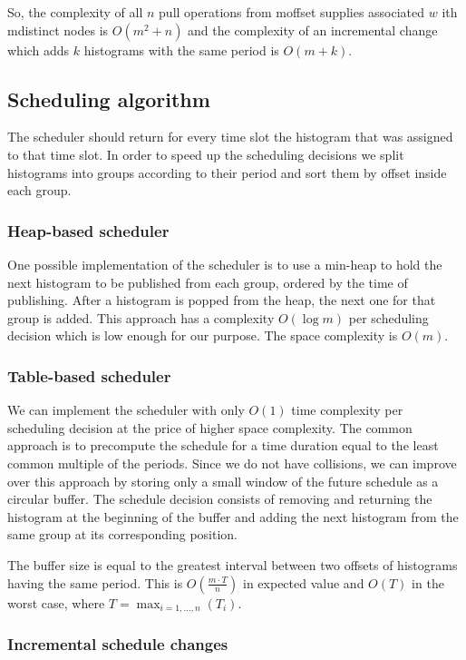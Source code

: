 So, the complexity of all $n$ pull operations from moffset supplies associated $w$ ith mdistinct nodes is $O(m^2+n)$ and the complexity of an incremental change which adds $k$ histograms with the same period is $O(m+k)$. 

\subsection*{Scheduling algorithm}
The scheduler should return for every time slot the histogram that was assigned to that time slot. In order to speed up the scheduling decisions we split histograms into groups according to their period and sort them by offset inside each group. 

\subsubsection*{Heap-based scheduler}
One possible implementation of the scheduler is to use a min-heap to hold the next histogram to be published from each group, ordered by the time of publishing. After a histogram is popped from the heap, the next one for that group is added. This approach has a complexity $O(\log m)$ per scheduling decision which is low enough for our purpose. The space complexity is $O(m)$.

\subsubsection*{Table-based scheduler}

We can implement the scheduler with only $O(1)$ time complexity per scheduling decision at the price of higher space complexity. The common approach is to precompute the schedule for a time duration equal to the least common multiple of the periods. Since we do not have collisions, we can improve over this approach by storing only a small window of the future schedule as a circular buffer. The schedule decision consists of removing and returning the histogram at the beginning of the buffer and adding the next histogram from the same group at its corresponding position.
 
The buffer size is equal to the greatest interval between two offsets of histograms having the same period. This is $O\left(\frac {m \cdot T}  n\right)$ in expected value and $O(T)$ in the worst case, where $T=\max_{i=1,\ldots,n}(T_i)$.

\subsubsection*{Incremental schedule changes}


